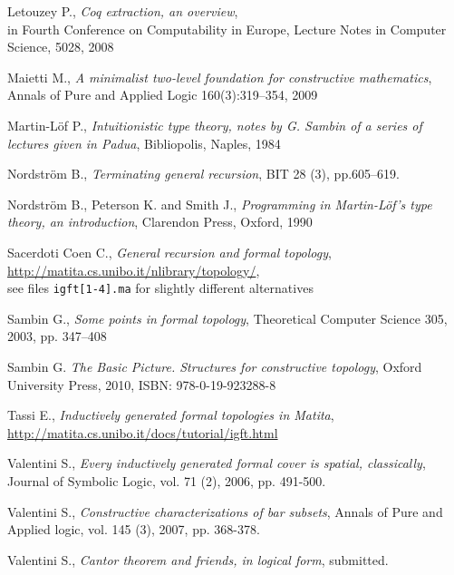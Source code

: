 \documentclass[copyright,creativecommons]{eptcs}
\begin{document}
\begin{thebibliography}{1}
Letouzey P.,
{\em Coq extraction, an overview},\\
in Fourth Conference on Computability in Europe,
Lecture Notes in Computer Science, 5028, 2008

Maietti M.,
{\em A minimalist two-level foundation for constructive mathematics},
Annals of Pure and Applied Logic 160(3):319--354, 2009 



Martin-L\"{o}f P.,
{\em Intuitionistic type theory, notes by G. Sambin of a series of lectures given in Padua},
Bibliopolis, Naples, 1984

Nordstr\"om B.,
{\em Terminating general recursion},
BIT 28 (3), pp.605--619.

Nordstr\"om B., Peterson K. and Smith J.,
{\em Programming in Martin-L\"of's type theory, an introduction},
Clarendon Press, Oxford, 1990

Sacerdoti Coen C., 
{\em General recursion and formal topology},\\
\url{http://matita.cs.unibo.it/nlibrary/topology/},\\
see files \verb+igft[1-4].ma+ for slightly different alternatives



Sambin G.,
{\em Some points in formal topology},
Theoretical Computer Science 305, 2003, pp. 347--408

Sambin G. 
{\em The Basic Picture. Structures for constructive topology},
Oxford University Press, 2010, ISBN: 978-0-19-923288-8









Tassi E., 
{\em Inductively generated formal topologies in Matita},\\
\url{http://matita.cs.unibo.it/docs/tutorial/igft.html}

Valentini S.,
{\em Every inductively generated formal cover is spatial, classically},
Journal of Symbolic Logic, vol. 71 (2), 2006, pp. 491-500.

Valentini S.,
{\em Constructive characterizations of bar subsets},
Annals of Pure and Applied logic, vol. 145 (3), 2007, pp. 368-378.

Valentini S.,
{\em Cantor theorem and friends, in logical form},
submitted.


\end{thebibliography}
\end{document}
